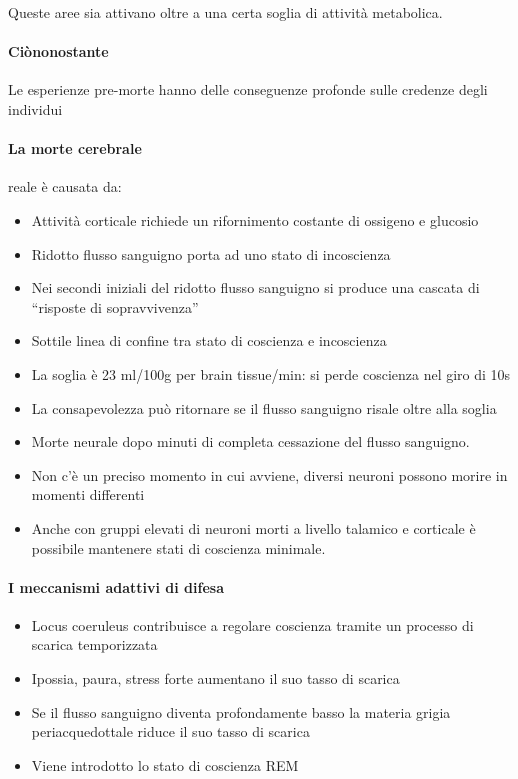 \documentclass[12pt, a4paper]{article}
\begin{document}
Queste aree sia attivano oltre a una certa soglia di attivit\`a metabolica.

\paragraph{Ciònonostante} Le esperienze pre-morte hanno delle conseguenze profonde sulle credenze degli individui

\paragraph{La morte cerebrale} reale \`e causata da:

\begin{itemize}
    \item Attivit\`a corticale richiede un rifornimento costante di ossigeno e glucosio
    \item Ridotto flusso sanguigno porta ad uno stato di incoscienza
    \item Nei secondi iniziali del ridotto flusso sanguigno si produce una cascata di ``risposte di sopravvivenza''
    \item Sottile linea di confine tra stato di coscienza e incoscienza
    \item La soglia \`e 23 ml/100g per brain tissue/min: si perde coscienza nel giro di 10s
    \item La consapevolezza può ritornare se il flusso sanguigno risale oltre alla soglia
    \item Morte neurale dopo minuti di completa cessazione del flusso sanguigno. 
    \item Non c'\`e un preciso momento in cui avviene, diversi neuroni possono morire in momenti differenti
    \item Anche  con gruppi elevati di neuroni morti a livello talamico e corticale \`e possibile mantenere stati di coscienza minimale.
\end{itemize}

\paragraph{I meccanismi adattivi di difesa} 

\begin{itemize}
    \item Locus coeruleus contribuisce a regolare coscienza tramite un processo di scarica temporizzata
    \item Ipossia, paura, stress forte aumentano il suo tasso di scarica
    \item Se il flusso sanguigno diventa profondamente basso la materia grigia periacquedottale riduce il suo tasso di scarica
    \item Viene introdotto lo stato di coscienza REM
\end{itemize}
\end{document}
